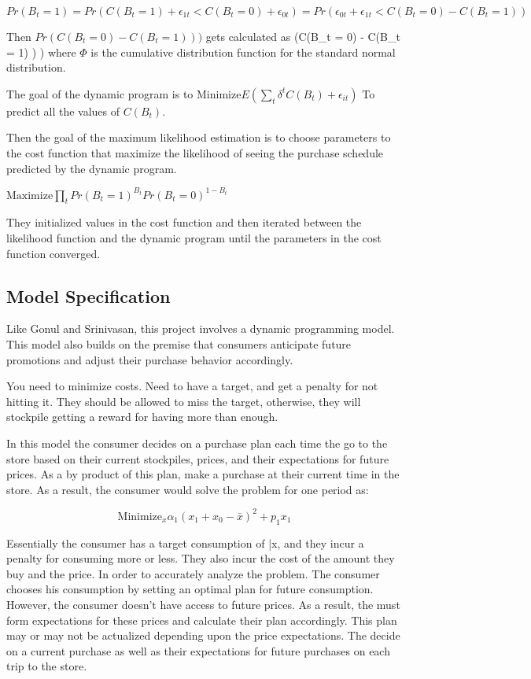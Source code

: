 \documentclass{article}
\begin{document}
$Pr(B_t=1) = Pr(C(B_t = 1) + \epsilon_{1t} < C(B_t = 0) + \epsilon_{0t} ) =  Pr(  \epsilon_{0t} + \epsilon_{1t} < C(B_t = 0) - C(B_t = 1) )   $

Then $Pr(C(B_t = 0) - C(B_t = 1) ) )$ gets calculated as \Phi(C(B_t = 0) - C(B_t = 1) ) ) where $\Phi$ is the cumulative distribution function for the standard normal distribution.

The goal of the dynamic program is to 
$\text{Minimize} E( \sum_t \delta^{t} C(B_t) + \epsilon_{it} )$
To predict all the values of $C(B_t)$.

Then the goal of the maximum likelihood estimation is to choose parameters to the cost function that maximize the likelihood of seeing the purchase schedule predicted by the dynamic program. 

$\text{Maximize} \prod_{t} Pr({B_t= 1})^{B_t} Pr(B_t=0)^{1-B_t} $

They initialized values in the cost function and then iterated between the likelihood function and the dynamic program until the parameters in the cost function converged.

\subsection{Model Specification}

Like Gonul and Srinivasan, this project involves a dynamic programming model. This model also builds on the premise that consumers anticipate future promotions and adjust their purchase behavior accordingly.

You need to minimize costs. Need to have a target, and get a penalty for not hitting it. They should be allowed to miss the target, otherwise, they will stockpile getting a reward for having more than enough.


In this model the consumer decides on a purchase plan each time the go to the store based on their current stockpiles, prices, and their expectations for future prices. As a by product of this plan, make a purchase at their current time in the store. As a result, the consumer would solve the problem for one period as:

$$ \text{Minimize}_{x}  \alpha_1 (x_1 +x_0 - \bar{x})^2 + p_1 x_1 $$

Essentially the consumer has a target consumption of \bar{x}, and they incur a penalty for consuming more or less. They also incur the cost of the amount they buy and the price. In order to accurately analyze the problem. The consumer chooses his consumption by setting an optimal plan for future consumption. However, the consumer doesn't have access to future prices. As a result, the must form expectations for these prices and calculate their plan accordingly. This plan may or may not be actualized depending upon the price expectations. The decide on a current purchase as well as their expectations for future purchases on each trip to the store.
\end{document}
